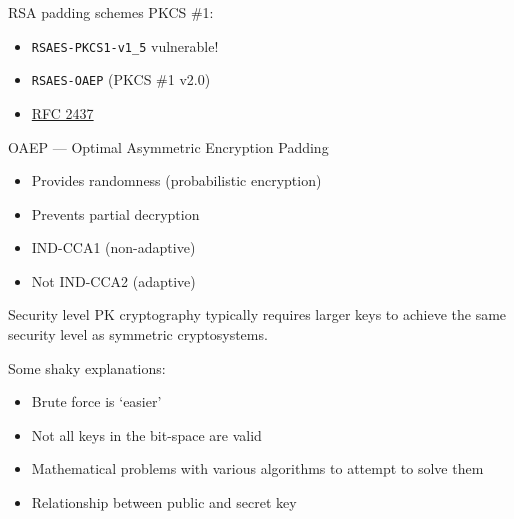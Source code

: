 \begin{frame}{RSA padding schemes}
  \pause
  PKCS \#1:
  \begin{itemize}[<+(1)->]
    \item \texttt{RSAES-PKCS1-v1\_5} vulnerable!
    \item \texttt{RSAES-OAEP} (PKCS \#1 v2.0)
    \item \href{https://datatracker.ietf.org/doc/html/rfc2437}{RFC 2437}
  \end{itemize}

  \pause
  OAEP --- Optimal Asymmetric Encryption Padding
  \begin{itemize}[<+(1)->]
    \item Provides randomness (probabilistic encryption)
    \item Prevents partial decryption
    \item IND-CCA1 (non-adaptive)
    \item Not IND-CCA2 (adaptive)
  \end{itemize}
\end{frame}

\begin{frame}{Security level}
  PK cryptography typically requires larger keys to achieve the same security level as symmetric cryptosystems.

  \pause
  Some shaky explanations:
  \begin{itemize}[<+(1)->]
    \item Brute force is `easier'
    \item Not all keys in the bit-space are valid
    \item Mathematical problems with various algorithms to attempt to solve them
    \item Relationship between public and secret key
  \end{itemize}
\end{frame}

